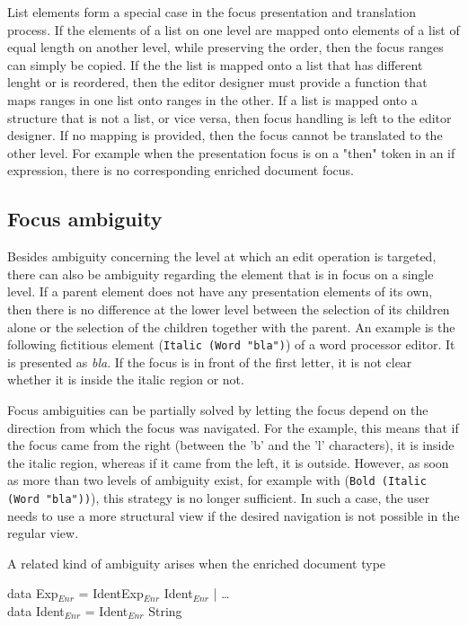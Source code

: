 List elements form a special case in the focus presentation and translation process. If the elements of a list on one level are mapped onto elements of a list of equal length on another level, while preserving the order, then the focus ranges can simply be copied. If the the list is mapped onto a list that has different lenght or is reordered, then the editor designer must provide a function that maps ranges in one list onto ranges in the other. If a list is mapped onto a structure that is not a list, or vice versa, then focus handling is left to the editor designer. If no mapping is provided, then the focus cannot be translated to the other level. For example when the presentation focus is on a "then" token in an if expression, there is no corresponding enriched document focus.

\subsection{Focus ambiguity}

Besides ambiguity concerning the level at which an edit operation is targeted, there can also be  ambiguity regarding the element that is in focus on a single level. If a parent element does not have any presentation elements of its own, then there is no difference at the lower level between the selection of its children alone or the selection of the children together with the parent. An example is the following fictitious element (\verb|Italic (Word "bla")|) of a word processor editor. It is presented as {\it bla}. If the focus is in front of the first letter, it is not clear whether it is inside the italic region or not. 

Focus ambiguities can be partially solved by letting the focus depend on the direction from which the focus was navigated. For the example, this means that if the focus came from the right (between the 'b' and the 'l' characters), it is inside the italic region, whereas if it came from the left, it is outside. However, as soon as more than two levels of ambiguity exist, for example with (\verb|Bold (Italic (Word "bla"))|), this strategy is no longer sufficient. In such a case, the user needs to use a more structural view if the desired navigation is not possible in the regular view.


A related kind of ambiguity arises when the enriched document type

\small \ttfamily
\begin{tabbing}

data Exp$_{Enr}$ = IdentExp$_{Enr}$ Ident$_{Enr}$ | \dots \\
data Ident$_{Enr}$ = Ident$_{Enr}$ String
\end{tabbing}
\rmfamily \normalsize

